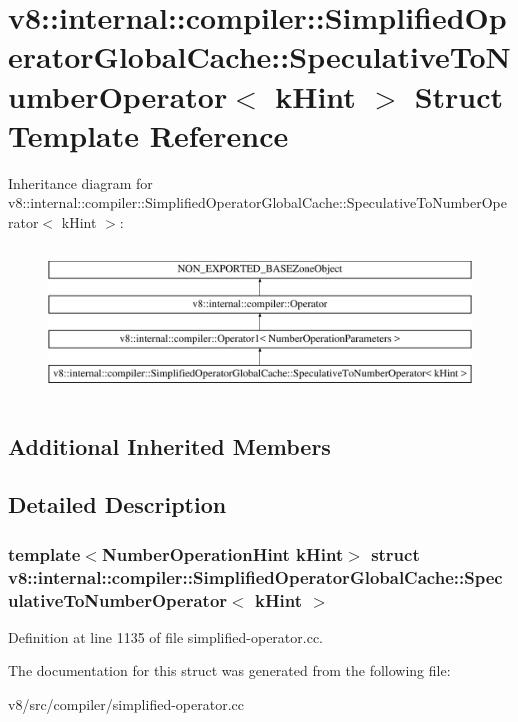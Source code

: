 \hypertarget{structv8_1_1internal_1_1compiler_1_1SimplifiedOperatorGlobalCache_1_1SpeculativeToNumberOperator}{}\section{v8\+:\+:internal\+:\+:compiler\+:\+:Simplified\+Operator\+Global\+Cache\+:\+:Speculative\+To\+Number\+Operator$<$ k\+Hint $>$ Struct Template Reference}
\label{structv8_1_1internal_1_1compiler_1_1SimplifiedOperatorGlobalCache_1_1SpeculativeToNumberOperator}
Inheritance diagram for v8\+:\+:internal\+:\+:compiler\+:\+:Simplified\+Operator\+Global\+Cache\+:\+:Speculative\+To\+Number\+Operator$<$ k\+Hint $>$\+:\begin{figure}[H]
\begin{center}
\leavevmode
\includegraphics[height=4.000000cm]{structv8_1_1internal_1_1compiler_1_1SimplifiedOperatorGlobalCache_1_1SpeculativeToNumberOperator}
\end{center}
\end{figure}
\subsection*{Additional Inherited Members}


\subsection{Detailed Description}
\subsubsection*{template$<$Number\+Operation\+Hint k\+Hint$>$\newline
struct v8\+::internal\+::compiler\+::\+Simplified\+Operator\+Global\+Cache\+::\+Speculative\+To\+Number\+Operator$<$ k\+Hint $>$}



Definition at line 1135 of file simplified-\/operator.\+cc.



The documentation for this struct was generated from the following file\+:\begin{DoxyCompactItemize}
\item 
v8/src/compiler/simplified-\/operator.\+cc\end{DoxyCompactItemize}
